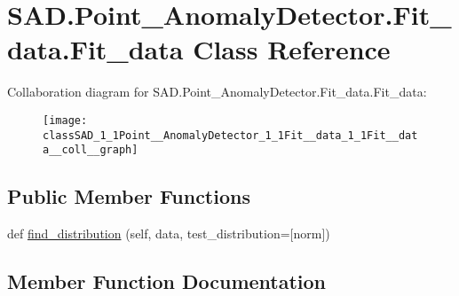 \hypertarget{classSAD_1_1Point__AnomalyDetector_1_1Fit__data_1_1Fit__data}{}\section{S\+A\+D.\+Point\+\_\+\+Anomaly\+Detector.\+Fit\+\_\+data.\+Fit\+\_\+data Class Reference}
\label{classSAD_1_1Point__AnomalyDetector_1_1Fit__data_1_1Fit__data}


Collaboration diagram for S\+A\+D.\+Point\+\_\+\+Anomaly\+Detector.\+Fit\+\_\+data.\+Fit\+\_\+data\+:\nopagebreak
\begin{figure}[H]
\begin{center}
\leavevmode
\texttt{[image: classSAD\_1\_1Point\_\_AnomalyDetector\_1\_1Fit\_\_data\_1\_1Fit\_\_data\_\_coll\_\_graph]}
\end{center}
\end{figure}
\subsection*{Public Member Functions}
\begin{DoxyCompactItemize}
\item 
def \hyperlink{classSAD_1_1Point__AnomalyDetector_1_1Fit__data_1_1Fit__data_aa5728a908c85eb5d012d9e6452280897}{find\+\_\+distribution} (self, data, test\+\_\+distribution=\mbox{[}\textquotesingle{}norm\textquotesingle{}\mbox{]})
\end{DoxyCompactItemize}


\subsection{Member Function Documentation}
